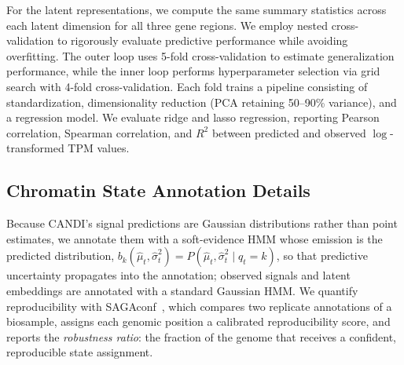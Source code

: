 For the latent representations, we compute the same summary statistics across each latent dimension for all three gene regions. We employ nested cross-validation to rigorously evaluate predictive performance while avoiding overfitting. The outer loop uses 5-fold cross-validation to estimate generalization performance, while the inner loop performs hyperparameter selection via grid search with 4-fold cross-validation. Each fold trains a pipeline consisting of standardization, dimensionality reduction (PCA retaining 50--90\% variance), and a regression model. We evaluate ridge and lasso regression, reporting Pearson correlation, Spearman correlation, and $R^2$ between predicted and observed $\log$-transformed TPM values.

\subsection{Chromatin State Annotation Details}

Because CANDI's signal predictions are Gaussian distributions rather than point estimates, we annotate them with a soft-evidence HMM whose emission is the predicted distribution, $b_k(\hat{\mu}_t, \hat{\sigma}^2_t) = P(\hat{\mu}_t, \hat{\sigma}^2_t \mid q_t = k)$, so that predictive uncertainty propagates into the annotation; observed signals and latent embeddings are annotated with a standard Gaussian HMM. We quantify reproducibility with SAGAconf~\cite{shahraki2024robust}, which compares two replicate annotations of a biosample, assigns each genomic position a calibrated reproducibility score, and reports the \emph{robustness ratio}: the fraction of the genome that receives a confident, reproducible state assignment.
